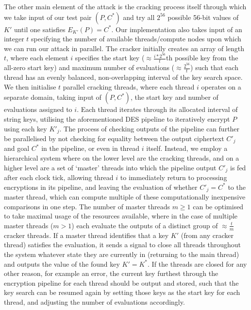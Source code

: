 \documentclass[a4paper, 11pt]{article}
\begin{document}
The other main element of the attack is the cracking process itself through which we take input of our test pair $(P, C^{*})$ and try all $2^{56}$ possible 56-bit values of $K'$ until one satisfies $E_{K'}(P) = C^{*}$. Our implementation also takes input of an integer $t$ specifying the number of available threads/compute nodes upon which we can run our attack in parallel. The cracker initially creates an array of length $t$, where each element $i$ specifies the start key ($\approx \frac{i*2^{56}}{t}$th possible key from the all-zero start key) and maximum number of evaluations ($\approx \frac{2^{56}}{t}$) such that each thread has an evenly balanced, non-overlapping interval of the key search space. We then initialise $t$ parallel cracking threads, where each thread $i$ operates on a separate domain, taking input of $(P, C^{*})$, the start key and number of evaluations assigned to $i$. Each thread iterates through its allocated interval of string keys, utilising the aforementioned DES pipeline to iteratively encrypt $P$ using each key $K'_{j}$. The process of checking outputs of the pipeline can further be parallelised by not checking for equality between the output ciphertext $C'_{j}$ and goal $C^{*}$ in the pipeline, or even in thread $i$ itself. Instead, we employ a hierarchical system where on the lower level are the cracking threads, and on a higher level are a set of `master' threads into which the pipeline output $C'_{j}$ is fed after each clock tick, allowing thread $i$ to immediately return to processing encryptions in its pipeline, and leaving the evaluation of whether $C'_{j} = C^{*}$ to the master thread, which can compute multiple of these computationally inexpensive comparisons in one step. The number of master threads $m \geq 1$ can be optimised to take maximal usage of the resources available, where in the case of multiple master threads ($m>1$) each evaluate the outputs of a distinct group of $\approx \frac{t}{m}$ cracker threads. If a master thread identifies that a key $K'$ (from any cracker thread) satisfies the evaluation, it sends a signal to close all threads throughout the system whatever state they are currently in (returning to the main thread) and outputs the value of the found key $K' = K^{*}$. If the threads are closed for any other reason, for example an error, the current key furthest through the encryption pipeline for each thread should be output and stored, such that the key search can be resumed again by setting those keys as the start key for each thread, and adjusting the number of evaluations accordingly.
\end{document}

